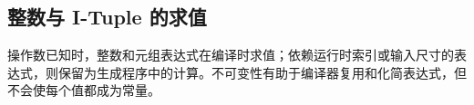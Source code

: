\subsection*{整数与 I-Tuple 的求值}

操作数已知时，整数和元组表达式在编译时求值；依赖运行时索引或输入尺寸的表达式，则保留为生成程序中的计算。不可变性有助于编译器复用和化简表达式，但不会使每个值都成为常量。
